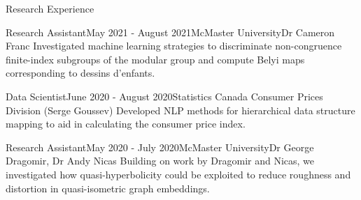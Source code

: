 \begin{rSection}{Research Experience}



\begin{rSubsection}{Research Assistant}{May 2021 - August 2021}{McMaster University}{Dr Cameron Franc}
	Investigated machine learning strategies to discriminate non-congruence finite-index subgroups of the modular group and compute Belyi maps corresponding to dessins d'enfants.
\end{rSubsection}

\begin{rSubsection}{Data Scientist}{June 2020 - August 2020}{Statistics Canada }{Consumer Prices Division (Serge Goussev)}
	Developed NLP methods for hierarchical data structure mapping to aid in calculating the consumer price index.
\end{rSubsection}


\begin{rSubsection}{Research Assistant}{May 2020 - July 2020}{McMaster University}{Dr George Dragomir, Dr Andy Nicas}
	Building on work by Dragomir and Nicas, we investigated how quasi-hyperbolicity could be exploited to reduce roughness and distortion in quasi-isometric graph embeddings.
\end{rSubsection}




\end{rSection}

